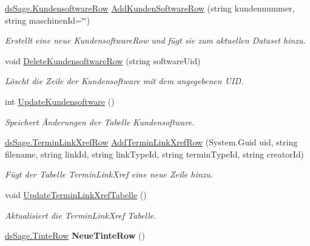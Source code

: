 \begin{DoxyCompactItemize}
\hyperlink{class_products_1_1_data_1_1ds_sage_1_1_kundensoftware_row}{ds\+Sage.\+Kundensoftware\+Row} \hyperlink{class_products_1_1_data_1_1_data_service_a1dd1653d6e0c2e10bfaa455545661af2}{Add\+Kunden\+Software\+Row} (string kundennummer, string maschinen\+Id=\char`\"{}\char`\"{})
\begin{DoxyCompactList}\small\item\em Erstellt eine neue Kundensoftware\+Row und fügt sie zum aktuellen Dataset hinzu. \end{DoxyCompactList}\item 
void \hyperlink{class_products_1_1_data_1_1_data_service_a2b297cb7c336ed3fe395bafd2f054928}{Delete\+Kundensoftware\+Row} (string software\+Uid)
\begin{DoxyCompactList}\small\item\em Löscht die Zeile der Kundensoftware mit dem angegebenen U\+ID. \end{DoxyCompactList}\item 
int \hyperlink{class_products_1_1_data_1_1_data_service_aa6fabb698619fef7864ab3614ce845e2}{Update\+Kundensoftware} ()
\begin{DoxyCompactList}\small\item\em Speichert Änderungen der Tabelle Kundensoftware. \end{DoxyCompactList}\item 
\hyperlink{class_products_1_1_data_1_1ds_sage_1_1_termin_link_xref_row}{ds\+Sage.\+Termin\+Link\+Xref\+Row} \hyperlink{class_products_1_1_data_1_1_data_service_af4f4bdcd79dac94349e41e168ea03506}{Add\+Termin\+Link\+Xref\+Row} (System.\+Guid uid, string filename, string link\+Id, string link\+Type\+Id, string termin\+Type\+Id, string creator\+Id)
\begin{DoxyCompactList}\small\item\em Fügt der Tabelle Termin\+Link\+Xref eine neue Zeile hinzu. \end{DoxyCompactList}\item 
void \hyperlink{class_products_1_1_data_1_1_data_service_a38a7deb57cb2d1ceef727115618924f7}{Update\+Termin\+Link\+Xref\+Tabelle} ()
\begin{DoxyCompactList}\small\item\em Aktualisiert die Termin\+Link\+Xref Tabelle. \end{DoxyCompactList}\item 
\hyperlink{class_products_1_1_data_1_1ds_sage_1_1_tinte_row}{ds\+Sage.\+Tinte\+Row} {\bfseries Neue\+Tinte\+Row} ()\hypertarget{class_products_1_1_data_1_1_data_service_a4dbca3adfb573a52d0e70490c7aaa2c9}{}\label{class_products_1_1_data_1_1_data_service_a4dbca3adfb573a52d0e70490c7aaa2c9}


\end{DoxyCompactItemize}
